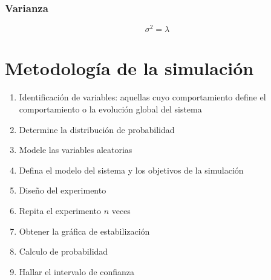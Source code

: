 \documentclass{article}
\begin{document}
\begin{multicols}{2}
                \subsubsection{Varianza}

                    \begin{equation*}
                        \sigma ^2 = \lambda
                    \end{equation*}

        \section{Metodología de la simulación}

            \begin{enumerate}
                \item Identificación de variables: aquellas cuyo comportamiento define el comportamiento o la evolución global del sistema
                \item  Determine la distribución de probabilidad
                \item Modele las variables aleatorias
                \item  Defina el modelo del sistema y los objetivos de la simulación
                \item  Diseño del experimento 
                \item  Repita el experimento $n$ veces
                \item  Obtener la gráfica de estabilización
                \item  Calculo de probabilidad
                \item  Hallar el intervalo de confianza
            \end{enumerate}
                
    \end{multicols}
\end{document}

